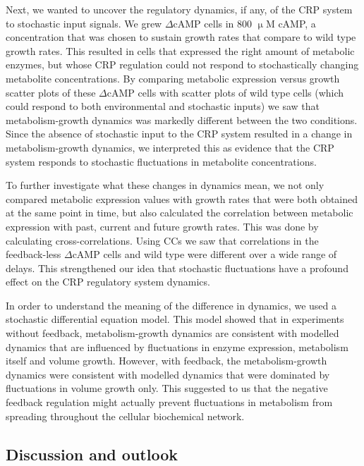 Next, we wanted to 
uncover
the regulatory dynamics, if any, of the CRP system to stochastic input signals.
%
We grew  $\Delta$cAMP cells in 800 $\upmu$M cAMP,
a concentration that was chosen to sustain growth rates that compare to wild type growth rates.
%
This resulted in cells that expressed the right amount of metabolic enzymes, 
but whose CRP regulation could not respond to stochastically changing metabolite concentrations.
%
By comparing metabolic expression versus growth scatter plots of these $\Delta$cAMP cells with
scatter plots of wild type cells (which could respond to both environmental and stochastic inputs)  
we saw that metabolism-growth dynamics was markedly different between the two conditions.
%
Since the absence 
of stochastic input to the CRP system resulted in a change in metabolism-growth dynamics, 
we interpreted this as evidence that the CRP system responds to stochastic fluctuations in metabolite concentrations.

To further investigate what these changes in dynamics mean, 
we not only compared metabolic expression values with growth rates that were both obtained at the same point in time,
but also calculated the correlation between metabolic expression with past, current and future growth rates.
%
This was done by calculating cross-correlations.
%
Using CCs we saw that correlations in the feedback-less $\Delta$cAMP cells and wild type were different over a wide range of delays.
%
This strengthened our idea that stochastic fluctuations have a profound effect on the CRP regulatory system dynamics.

In order to understand the meaning of the difference in dynamics, we used a stochastic differential equation model.
%
This model showed that in experiments without feedback, metabolism-growth dynamics are consistent with modelled dynamics that are influenced by fluctuations in enzyme expression, metabolism itself and volume growth.
% 
However, with feedback, the metabolism-growth dynamics were consistent with modelled dynamics that were dominated by fluctuations in volume growth only.
%
This suggested to us that the negative feedback regulation might actually 
prevent fluctuations in metabolism from spreading throughout the cellular biochemical network.

\subsection{Discussion and outlook}

